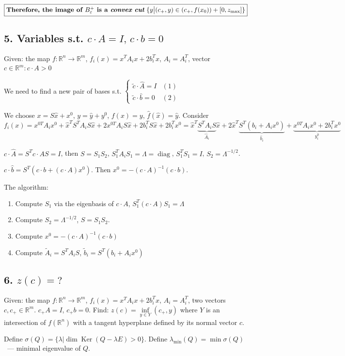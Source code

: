 \documentclass[a4paper]{article}
\DeclareMathOperator{\diag}{diag}
\DeclareMathOperator{\Ker}{Ker}
\begin{document}
$\boxed{\mbox{{\bf Therefore, the image of $B_\varepsilon^+$ is a {\em convex cut}} $\{y\big| (c_+,y)\in (c_+,f(x_0))+[0,z_{\max}]\}$}}$

\subsection*{5. Variables s.t. $c\cdot A=I,\,c\cdot b=0$}
Given: the map $f\colon\mathbb{R}^n\to\mathbb{R}^m$, $f_i(x)=x^TA_ix+2b_i^Tx$, $A_i=A_i^T$, vector $c\in\mathbb{R}^m\colon c\cdot A>0$

We need to find a new pair of bases s.t. $\begin{cases}
\tilde{c}\cdot \hat{A}=I & (1)\\
\tilde{c}\cdot \hat{b}=0 & (2)
\end{cases}$

We choose $x=S\hat{x}+x^0$, $y=\hat{y}+y^0$, $f(x)=y$, $\hat{f}(\hat{x})=\hat{y}$.
Consider $f_i(x)=x^{0T}A_ix^0+\hat{x}^TS^TA_iS\hat{x}+2x^{0T}A_iS\hat{x}+2b_i^TS\hat{x}+2b_i^Tx^0=\hat{x}^T\underbrace{S^TA_iS}_{\hat{A}_i}\hat{x}+2\hat{x}^T\underbrace{S^T(b_i+A_ix^0)}_{\hat{b}_i}+\underbrace{x^{0T}A_ix^0+2b_i^Tx^0}_{y^0_i}$

$c\cdot \hat{A}=S^Tc\cdot AS=I$, then $S=S_1S_2$, $S_1^TA_iS_1=\Lambda=\diag$, $S_1^TS_1=I$, $S_2=\Lambda^{-1/2}$.

$c\cdot \hat{b}=S^T(c\cdot b+(c\cdot A)x^0)$. Then $x^0=-(c\cdot A)^{-1}(c\cdot b)$.

The algorithm:
\begin{enumerate}
\item Compute $S_1$ via the eigenbasis of $c\cdot A$, $S_1^T(c\cdot A)S_1=\Lambda$
\item Compute $S_2=\Lambda^{-1/2}$, $S=S_1S_2$.
\item Compute $x^0=-(c\cdot A)^{-1}(c\cdot b)$
\item Compute $\tilde{A}_i=S^TA_iS$, $\tilde{b}_i=S^T(b_i+A_ix^0)$
\end{enumerate}
\subsection*{6. $z(c)=?$}
Given: the map $f\colon\mathbb{R}^n\to\mathbb{R}^m$, $f_i(x)=x^TA_ix+2b_i^Tx$, $A_i=A_i^T$, two vectors $c,c_+\in\mathbb{R}^m$. $c_+A=I$, $c_+b=0$.
Find: $z(c)=\inf\limits_{y\in Y} (c_+, y)$ where $Y$ is an intersection of $f(\mathbb{R}^n)$ with a tangent hyperplane defined by its normal vector $c$.

Define $\sigma(Q)=\{\lambda\big |\dim\Ker (Q-\lambda E)>0\}$. Define $\lambda_{\min}(Q)=\min\sigma(Q)$~--- minimal eigenvalue of $Q$.
\end{document}
